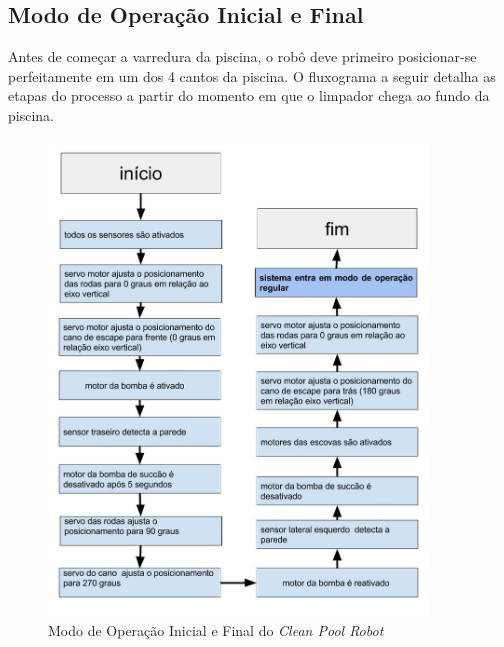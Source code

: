 \subsection{Modo de Operação Inicial e Final}
Antes de começar a varredura da piscina, o robô deve primeiro posicionar-se
perfeitamente em um dos 4 cantos da piscina. O fluxograma a seguir detalha
as etapas do processo a partir do momento em que o limpador chega ao fundo
da piscina.
\par
\begin{figure}[h]
  \centering
  \includegraphics[width=0.9\textwidth]{figures/flow-initial-robot.jpg}
  \caption{Modo de Operação Inicial e Final do \textit{Clean Pool Robot}}
  \label{fig:flow-initial-robot}
\end{figure}
\FloatBarrier

